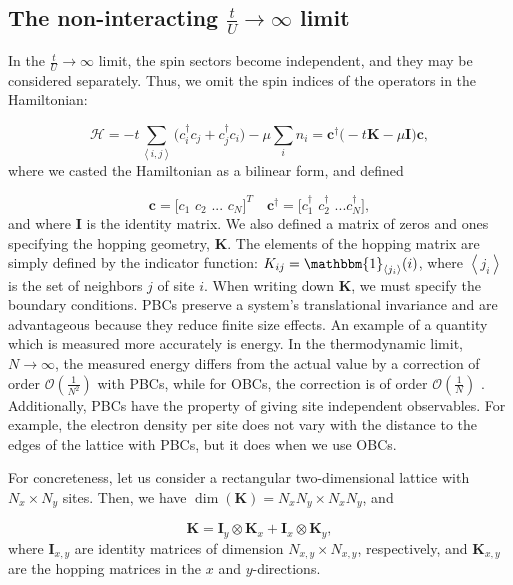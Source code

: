 \subsection{The non-interacting $\frac{t}{U} \rightarrow \infty$ limit}

In the $\frac{t}{U} \rightarrow \infty$ limit, the spin sectors become independent, and they may be considered separately.
Thus, we omit the spin indices of the operators in the Hamiltonian:

\begin{equation}
\mathcal{H} = -t \sum_{\left\langle i, j \right\rangle} \bigg( c_i^\dagger c_j + c_j^\dagger c_i \bigg) - \mu \sum_i n_i = \bm c^\dagger \bigg( -t \bm K - \mu \bm I \bigg) \bm c ,
\end{equation}
where we casted the Hamiltonian as a bilinear form, and defined

\begin{equation}
\bm c = \bigg[ c_1 \,\, c_2 \,\, ... \,\, c_N \bigg]^T \quad \bm c^\dagger = \bigg[c_1^\dagger \,\, c_2^\dagger \,\, ... c_N^\dagger \bigg] ,
\end{equation}
and where $\bm I$ is the identity matrix.
We also defined a matrix of zeros and ones specifying the hopping geometry, $\bm K$. The elements of the hopping matrix are simply defined by the indicator function: $K_{ij} = \mathbbm{1}_{\left\langle j_i \right\rangle} (i)$, where $\left\langle j_i \right\rangle$ is the set of neighbors $j$ of site $i$.
When writing down $\bm K$, we must specify the boundary conditions.
\acp{PBC} preserve a system's translational invariance and are advantageous because they reduce finite size effects.
An example of a quantity which is measured more accurately is energy.
In the thermodynamic limit, $N \rightarrow \infty$, the measured energy differs from the actual value by a correction of order $\mathcal{O}(\frac{1}{N^2})$ with \acp{PBC}, while for \acp{OBC}, the correction is of order $\mathcal{O}(\frac{1}{N})$ \cite{hou_numerical_2009}.
Additionally, \acp{PBC} have the property of giving site independent observables.
For example, the electron density per site does not vary with the distance to the edges of the lattice with \acp{PBC}, but it does when we use \acp{OBC}.

For concreteness, let us consider a rectangular two-dimensional lattice with $N_x \times N_y$ sites. Then, we have $\dim(\bm K) = N_x N_y \times N_x N_y $, and

\begin{equation}
\bm K = \bm I_y \otimes \bm K_x + \bm I_x \otimes \bm K_y ,
\end{equation}
where $\bm I_{x, y}$ are identity matrices of dimension $N_{x, y} \times N_{x, y}$, respectively, and $\bm K_{x, y}$ are the hopping matrices in the $x$ and $y$-directions.

